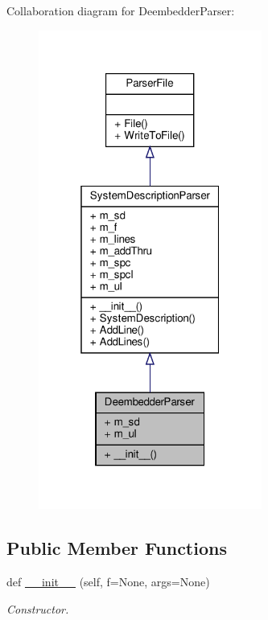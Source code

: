 Collaboration diagram for Deembedder\+Parser\+:
\nopagebreak
\begin{figure}[H]
\begin{center}
\leavevmode
\includegraphics[width=208pt]{classSignalIntegrity_1_1Parsers_1_1DeembedderParser_1_1DeembedderParser__coll__graph}
\end{center}
\end{figure}
\subsection*{Public Member Functions}
\begin{DoxyCompactItemize}
\item 
def \hyperlink{classSignalIntegrity_1_1Parsers_1_1DeembedderParser_1_1DeembedderParser_af9856388f7022892c3159ad55872a27e}{\+\_\+\+\_\+init\+\_\+\+\_\+} (self, f=None, args=None)
\begin{DoxyCompactList}\small\item\em Constructor. \end{DoxyCompactList}\end{DoxyCompactItemize}


